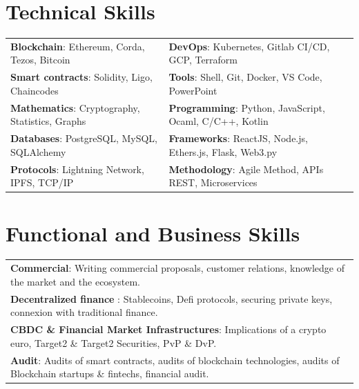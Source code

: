 \documentclass[10pt]{article}
\begin{document}
\vspace{2ex}

\section*{Technical Skills}

\vspace{2ex}

\begin{tabular}{ l l }
\textbf{Blockchain}: Ethereum, Corda, Tezos, Bitcoin & \textbf{DevOps}: Kubernetes, Gitlab CI/CD, GCP, Terraform \\[0.1cm]
\textbf{Smart contracts}: Solidity, Ligo, Chaincodes & \textbf{Tools}: Shell, Git, Docker, VS Code, PowerPoint \\[0.1cm]
\textbf{Mathematics}: Cryptography, Statistics, Graphs & \textbf{Programming}: Python, JavaScript, Ocaml, C/C++, Kotlin \\[0.1cm]
\textbf{Databases}: PostgreSQL, MySQL, SQLAlchemy & \textbf{Frameworks}: ReactJS, Node.js, Ethers.js, Flask, Web3.py \\[0.1cm]
\textbf{Protocols}: Lightning Network, IPFS, TCP/IP & \textbf{Methodology}: Agile Method, APIs REST, Microservices \\[0.1cm]
\end{tabular}

\vspace{2ex}

\section*{Functional and Business Skills}

\vspace{2ex}

\begin{tabular}{ l }
\textbf{Commercial}: Writing commercial proposals, customer relations, knowledge of the market and the ecosystem.\\[0.1cm]
\textbf{Decentralized finance} : Stablecoins, Defi protocols, securing private keys, connexion with traditional finance.\\[0.1cm]
\textbf{CBDC \& Financial Market Infrastructures}: Implications of a crypto euro, Target2 \& Target2 Securities, PvP \& DvP.\\[0.1cm]
\textbf{Audit}: Audits of smart contracts, audits of blockchain technologies, audits of Blockchain startups \& fintechs, financial audit.\\[0.1cm]
\end{tabular}
\end{document}
